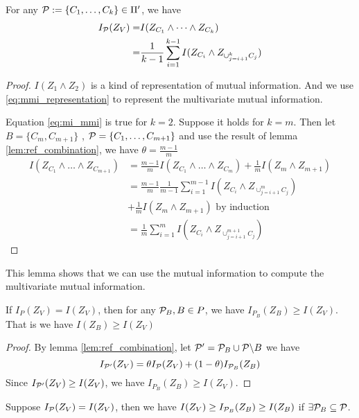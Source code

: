 \begin{lemma}\label{lem:mi_split}
For any $\P:=\{C_1, \dots, C_k\} \in \Pi'$, we have
\begin{align}
I_{\P}(Z_V) =& I(Z_{C_1} \wedge \dots \wedge Z_{C_k}) \label{eq:mmi_representation} \\
=& { 1 \over k-1} \sum_{i=1}^{k-1} I(Z_{C_i} \wedge Z_{\cup_{j=i+1}^k C_j}) \label{eq:mi_mmi}
\end{align}
\end{lemma}
\begin{proof}
$I(Z_1 \wedge Z_2)$ is a kind of representation of mutual information.
And we use \eqref{eq:mmi_representation} to represent the multivariate mutual information.

Equation \eqref{eq:mi_mmi} is true for $k=2$. Suppose it holds for $k=m$. Then
let $B=\{C_m, C_{m+1}\}$ , $\P=\{C_1, \dots, C_{m+1}\}$
and use the result of lemma \ref{lem:ref_combination}, 
we have $\theta = \frac{m-1}{m}$
\begin{align*}
I(Z_{C_1} \wedge \dots \wedge Z_{C_{m+1}}) & = 
 \frac{m-1}{m} I(Z_{C_1} \wedge \dots \wedge Z_{C_m})
+ \frac{1}{m}  I(Z_{m} \wedge Z_{m+1}) \\
& = \frac{m-1}{m} \frac{1}{m-1}\sum_{i=1}^{m-1} I(Z_{C_i} \wedge Z_{\cup_{j=i+1}^m C_j})\\
& + \frac{1}{m}  I(Z_{m} \wedge Z_{m+1})\textrm{ by induction} \\
& = \frac{1}{m} \sum_{i=1}^{m} I(Z_{C_i} \wedge Z_{\cup_{j=i+1}^{m+1} C_j})
\end{align*}
\end{proof}
\begin{remark}
This lemma shows that we can use the mutual information to compute the multivariate mutual information.
\end{remark}
\begin{lemma}
If $I_{P}(Z_V) = I(Z_V)$, then for any $\P_B, B\in P$, we have $I_{P_B}(Z_B) \geq I(Z_V)$. That is we have $I(Z_B) \geq I(Z_V)$
\end{lemma}
\begin{proof}
By lemma \ref{lem:ref_combination}, let $\P' = \P_B \cup \P\backslash B$ we have 
\begin{equation}
I_{\P'}(Z_V) = \theta I_{\P}(Z_V) + (1-\theta) I_{\P_B}(Z_B)
\end{equation}
Since $I_{\P'}(Z_V)\geq I(Z_V)$, we have $I_{P_B}(Z_B) \geq I(Z_V)$.
\end{proof}
\begin{lemma}\label{lem:smallZB}
Suppose $I_{\P}(Z_V) = I(Z_V)$, then we have $I(Z_V) \geq I_{\P_B}(Z_B) \geq I(Z_B)$ if $\exists \P_B \subseteq \P$.
\end{lemma}
